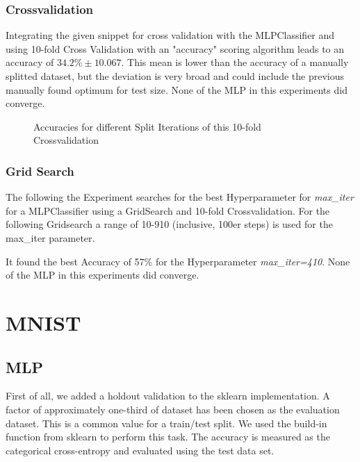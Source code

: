 \documentclass[a4paper, 11pt]{article}
\begin{document}
\subsubsection{Crossvalidation}

Integrating the given snippet for cross validation with the MLPClassifier and using 10-fold Cross Validation with an "accuracy" scoring algorithm leads to an accuracy of $ 34.2\% \pm 10.067 $.
This mean is lower than the accuracy of a manually splitted dataset, but the deviation is very broad and could include the previous manually found optimum for test size.
None of the MLP in this experiments did converge.

\begin{figure}[H]
\centering
{}
\caption{Accuracies for different Split Iterations of this 10-fold Crossvalidation}
\end{figure}

\subsubsection{Grid Search}

The following the Experiment searches for the best Hyperparameter for \textit{max\_iter} for a MLPClassifier using a GridSearch and 10-fold Crossvalidation.
For the following Gridsearch a range of 10-910 (inclusive, 100er steps) is used for the max\_iter parameter.

It found the best Accuracy of 57\% for the Hyperparameter \textit{max\_iter=410}.
None of the MLP in this experiments did converge.

\section{MNIST}
\subsection{MLP}
First of all, we added a holdout validation to the sklearn implementation.
A factor of approximately one-third of dataset has been chosen as the evaluation dataset.
This is a common value for a train/test split. We used the build-in function from sklearn to perform this task.
The accuracy is measured as the categorical cross-entropy and evaluated using the test data set.
\end{document}
